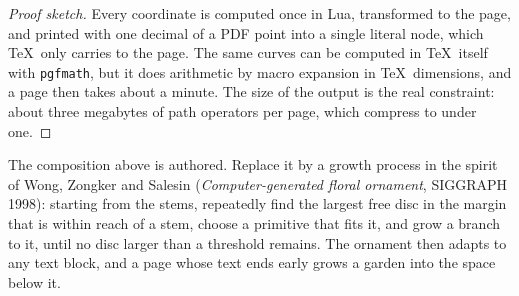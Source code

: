 \begin{proof}[Proof sketch]
  Every coordinate is computed once in Lua, transformed to the page,
  and printed with one
  decimal of a PDF point into a single literal node, which \TeX\ only
  carries to the page.
  The same curves can be computed in \TeX\ itself with
  \texttt{pgfmath}, but it does
  arithmetic by macro expansion in \TeX\ dimensions, and a page then
  takes about a minute. The
  size of the output is the real constraint: about
  three megabytes of path operators per page, which compress to under one.
\end{proof}

\begin{exercise}
  The composition above is authored. Replace it by a growth process
  in the spirit of Wong,
  Zongker and Salesin (\emph{Computer-generated floral ornament},
  SIGGRAPH 1998): starting
  from the stems, repeatedly find the largest free disc in the margin
  that is within reach of
  a stem, choose a primitive that fits it, and grow a branch to it,
  until no disc larger than
  a threshold remains. The ornament then adapts to any text block,
  and a page whose text
  ends early grows a garden into the space below it.
\end{exercise}
